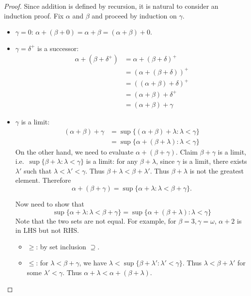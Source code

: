 \documentclass[a4paper]{article}
\begin{document}
\begin{proof}
  Since addition is defined by recursion, it is natural to consider an induction proof. Fix \(\alpha\) and \(\beta\) and proceed by induction on \(\gamma\).
  \begin{itemize}
  \item \(\gamma = 0\): \(\alpha + (\beta + 0) = \alpha + \beta = (\alpha + \beta) + 0\).
  \item \(\gamma = \delta^+\) is a successor:
    \begin{align*}
      \alpha + (\beta + \delta^+)
      &= \alpha + (\beta + \delta)^+ \\
      &= (\alpha + (\beta + \delta))^+ \\
      &= ((\alpha + \beta) + \delta)^+ \\
      &= (\alpha + \beta) + \delta^+ \\
      &= (\alpha + \beta) + \gamma
    \end{align*}
  \item \(\gamma\) is a limit:
    \begin{align*}
      (\alpha + \beta) + \gamma
      &= \sup \{(\alpha + \beta) + \lambda: \lambda < \gamma\} \\
      &= \sup \{\alpha + (\beta + \lambda): \lambda < \gamma\}
    \end{align*}
    On the other hand, we need to evaluate \(\alpha + (\beta + \gamma)\). Claim \(\beta + \gamma\) is a limit, i.e.\ \(\sup \{\beta + \lambda: \lambda < \gamma\}\) is a limit: for any \(\beta + \lambda\), since \(\gamma\) is a limit, there exists \(\lambda'\) such that \(\lambda < \lambda' < \gamma\). Thus \(\beta + \lambda < \beta + \lambda'\). Thus \(\beta + \lambda\) is not the greatest element. Therefore
    \[
      \alpha + (\beta + \gamma) = \sup \{\alpha + \lambda: \lambda < \beta + \gamma\}.
    \]

    Now need to show that
    \[
      \sup \{\alpha + \lambda: \lambda < \beta + \gamma\} = \sup \{\alpha + (\beta + \lambda): \lambda < \gamma\} 
    \]
    Note that the two sets are not equal. For example, for \(\beta = 3, \gamma = \omega\), \(\alpha + 2\) is in LHS but not RHS.
    \begin{itemize}
    \item \(\geq\): by set inclusion \(\supseteq\).
    \item \(\leq\): for \(\lambda < \beta + \gamma\), we have \(\lambda < \sup \{\beta + \lambda': \lambda' < \gamma\}\). Thus \(\lambda < \beta + \lambda'\) for some \(\lambda' < \gamma\). Thus \(\alpha + \lambda < \alpha + (\beta + \lambda)\).
    \end{itemize}
  \end{itemize}
\end{proof}
\end{document}
